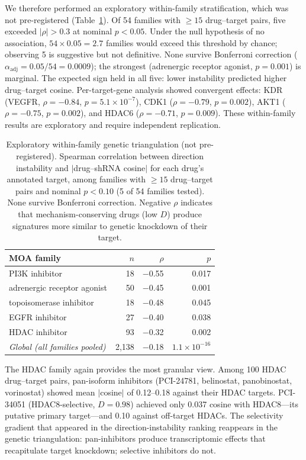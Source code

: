 \documentclass[11pt]{article}
\begin{document}
We therefore performed an exploratory within-family stratification,
which was not pre-registered (Table~\ref{tab:triangulation}). Of 54
families with $\geq 15$ drug--target pairs, five exceeded $|\rho| > 0.3$
at nominal $p < 0.05$. Under the null hypothesis of no association,
$54 \times 0.05 = 2.7$ families would exceed this threshold by chance;
observing 5 is suggestive but not definitive.
None survive Bonferroni correction
($\alpha_{\text{adj}} = 0.05/54 = 0.0009$); the strongest
(adrenergic receptor agonist, $p = 0.001$) is marginal. The expected
sign held in all five: lower instability predicted higher drug--target
cosine. Per-target-gene analysis showed convergent effects:
KDR (VEGFR, $\rho = -0.84$, $p = 5.1 \times 10^{-7}$), CDK1
($\rho = -0.79$, $p = 0.002$), AKT1 ($\rho = -0.75$, $p = 0.002$),
and HDAC6 ($\rho = -0.71$, $p = 0.009$). These within-family results
are exploratory and require independent replication.

\begin{table}[t]
\centering
\caption{Exploratory within-family genetic triangulation (not
pre-registered). Spearman correlation between direction instability and
$|$drug--shRNA cosine$|$ for each drug's annotated target, among families
with $\geq 15$ drug--target pairs and nominal $p < 0.10$ (5 of 54 families
tested). None survive Bonferroni correction. Negative $\rho$ indicates that
mechanism-conserving drugs (low $D$) produce signatures more similar to
genetic knockdown of their target.}
\label{tab:triangulation}
\small
\begin{tabular}{lrrr}
\toprule
MOA family & $n$ & $\rho$ & $p$ \\
\midrule
PI3K inhibitor & 18 & $-$0.55 & 0.017 \\
adrenergic receptor agonist & 50 & $-$0.45 & 0.001 \\
topoisomerase inhibitor & 18 & $-$0.48 & 0.045 \\
EGFR inhibitor & 27 & $-$0.40 & 0.038 \\
HDAC inhibitor & 93 & $-$0.32 & 0.002 \\
\midrule
\emph{Global (all families pooled)} & 2{,}138 & $-$0.18 & $1.1 \times 10^{-16}$ \\
\bottomrule
\end{tabular}
\end{table}

The HDAC family again provides the most granular view. Among 100 HDAC
drug--target pairs, pan-isoform inhibitors (PCI-24781, belinostat,
panobinostat, vorinostat) showed mean $|$cosine$|$ of 0.12--0.18 against
their HDAC targets. PCI-34051 (HDAC8-selective, $D = 0.98$) achieved only
0.037 cosine with HDAC8---its putative primary target---and 0.10 against
off-target HDACs. The selectivity gradient that appeared in the
direction-instability ranking reappears in the genetic triangulation:
pan-inhibitors produce transcriptomic effects that recapitulate target
knockdown; selective inhibitors do not.
\end{document}
